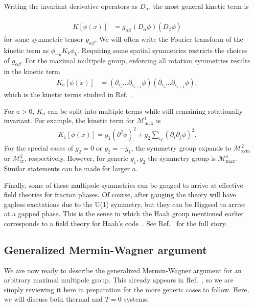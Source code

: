 \documentclass[pra,aps,twocolumn, amsfonts,amsmath,amssymb,nofootinbib,superscriptaddress]{revtex4-2}
\renewcommand{\max}{\text{max}}
\begin{document}
Writing the invariant derivative operators as $D_\alpha$, the most general kinetic term is ~\cite{Gromov2019} 
\begin{align}
K[\phi(x)] &= g_{\alpha\beta} (D_\alpha \phi) (D_\beta \phi)
\end{align}
for some symmetric tensor $g_{\alpha\beta}$.
We will often write the Fourier transform of the kinetic term as $\phi_{-k} K_k \phi_k$.  Requiring some spatial symmetries restricts the choices of $g_{\alpha \beta}$. For the maximal multipole group, enforcing all rotation symmetries results in the kinetic term
\begin{align}
K_a[\phi(x)] &= (\partial_{i_1}\dots \partial_{i_{a+1}} \phi) (\partial_{i_1} \dots \partial_{i_{a+1}} \phi),
\end{align}
which is the kinetic terms studied in Ref.~\cite{Griffin2015}. 

For $a>0$, $K_a$ can be split into multiple terms while still remaining rotationally invariant. For example, the kinetic term for $\mathcal{M}^1_\max$ is 
\begin{align}
K_1[\phi(x)] = g_1 (\partial^2\phi)^2 + g_2 \sum_{ij} (\partial_i \partial_j \phi)^2.
\end{align}
For the special cases of $g_2=0$ or $g_2=-g_1$, the symmetry group expands to $\mathcal{M}^2_\text{sym}$ or $\mathcal{M}^2_\text{tr}$, respectively. However, for generic $g_1,g_2$ the symmetry group is $\mathcal{M}^1_\max$. Similar statements can be made for larger $a$.

Finally, some of these multipole symmetries can be gauged to arrive at effective field theories for fracton phases. Of course, after gauging the theory will have gapless excitations due to the U(1) symmetry, but they can be Higgsed to arrive at a gapped phase. This is the sense in which the Haah group mentioned earlier corresponds to a field theory for Haah's code~\cite{BB}. See Ref.~\cite{BB, Gromov2019} for the full story. 

\subsection{Generalized Mermin-Wagner argument}

We are now ready to describe the generalized Mermin-Wagner argument for an arbitrary maximal multipole group. This already appears in Ref.~\cite{Griffin2015}, so we are simply reviewing it here in preparation for the more generic cases to follow. Here, we will discuss both thermal and $T=0$ systems.
\end{document}

